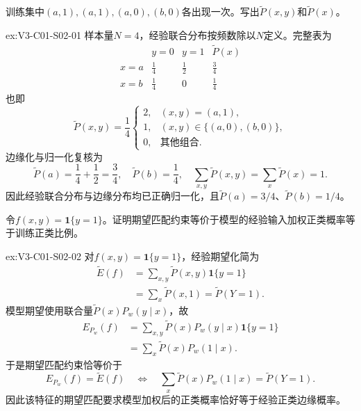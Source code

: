 \begin{SLChapterExercisePairSection}
\begin{exercise}\label{ex:V3-C01-S02-01}
训练集中$(a,1),(a,1),(a,0),(b,0)$各出现一次。写出$\widetilde P(x,y)$和$\widetilde P(x)$。
\end{exercise}
\ifSLFullEdition
{}\label{sol:V3-C01-S02-01}
\begin{chapterexercisesolution}{ex:V3-C01-S02-01}
样本量$N=4$，经验联合分布按频数除以$N$定义。完整表为
\[
\begin{array}{c|cc|c}
&y=0&y=1&\widetilde P(x)\\ \hline
x=a&\frac14&\frac12&\frac34\\
x=b&\frac14&0&\frac14
\end{array}
\]
也即
\[
\widetilde P(x,y)=\frac1{4}
\begin{cases}
2,&(x,y)=(a,1),\\
1,&(x,y)\in\{(a,0),(b,0)\},\\
0,&\text{其他组合}.
\end{cases}
\]
边缘化与归一化复核为
\[
\widetilde P(a)=\frac14+\frac12=\frac34,
\quad
\widetilde P(b)=\frac14,
\quad
\sum_{x,y}\widetilde P(x,y)=\sum_x\widetilde P(x)=1.
\]
因此经验联合分布与边缘分布均已正确归一化，且$\widetilde P(a)=3/4$、$\widetilde P(b)=1/4$。
\end{chapterexercisesolution}
\fi

\begin{exercise}\label{ex:V3-C01-S02-02}
令$f(x,y)=\mathbf1\{y=1\}$。证明期望匹配约束等价于模型的经验输入加权正类概率等于训练正类比例。
\end{exercise}
\ifSLFullEdition
{}\label{sol:V3-C01-S02-02}
\begin{chapterexercisesolution}{ex:V3-C01-S02-02}
对$f(x,y)=\mathbf1\{y=1\}$，经验期望化简为
\[
\begin{aligned}
\widetilde E(f)
&=\sum_{x,y}\widetilde P(x,y)\mathbf1\{y=1\}\\
&=\sum_x\widetilde P(x,1)
=\widetilde P(Y=1).
\end{aligned}
\]
模型期望使用联合量$\widetilde P(x)P_w(y\mid x)$，故
\[
\begin{aligned}
E_{P_w}(f)
&=\sum_{x,y}\widetilde P(x)P_w(y\mid x)\mathbf1\{y=1\}\\
&=\sum_x\widetilde P(x)P_w(1\mid x).
\end{aligned}
\]
于是期望匹配约束恰等价于
\[
E_{P_w}(f)=\widetilde E(f)
\quad\Longleftrightarrow\quad
\sum_x\widetilde P(x)P_w(1\mid x)=\widetilde P(Y=1).
\]
因此该特征的期望匹配要求模型加权后的正类概率恰好等于经验正类边缘概率。
\end{chapterexercisesolution}
\fi


\end{SLChapterExercisePairSection}
